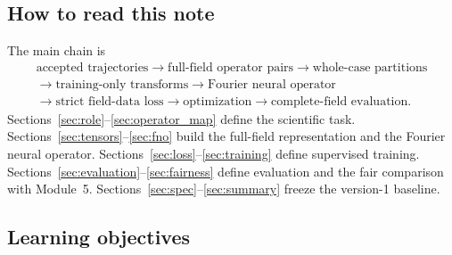 \documentclass[11pt]{article}
\begin{document}
\subsection*{How to read this note}

The main chain is
\[
\begin{gathered}
\text{accepted trajectories}
\longrightarrow \text{full-field operator pairs}
\longrightarrow \text{whole-case partitions}\\
\longrightarrow \text{training-only transforms}
\longrightarrow \text{Fourier neural operator}\\
\longrightarrow \text{strict field-data loss}
\longrightarrow \text{optimization}
\longrightarrow \text{complete-field evaluation}.
\end{gathered}
\]
Sections~\ref{sec:role}--\ref{sec:operator_map} define the scientific task. Sections~\ref{sec:tensors}--\ref{sec:fno} build the full-field representation and the Fourier neural operator. Sections~\ref{sec:loss}--\ref{sec:training} define supervised training. Sections~\ref{sec:evaluation}--\ref{sec:fairness} define evaluation and the fair comparison with Module~5. Sections~\ref{sec:spec}--\ref{sec:summary} freeze the version-1 baseline.

\subsection*{Learning objectives}
\end{document}
